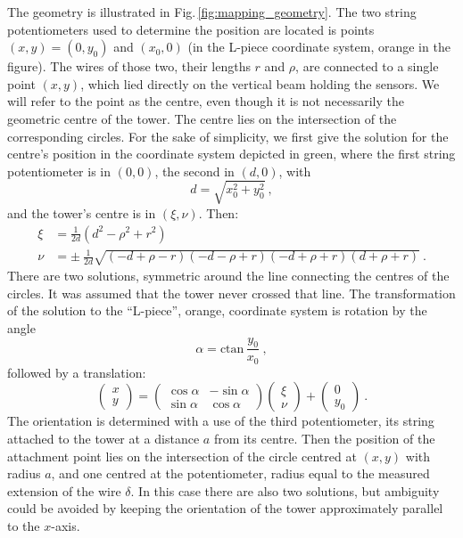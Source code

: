 The geometry is illustrated in Fig.\,\ref{fig:mapping_geometry}. The two string potentiometers used to determine the position are located is points $(x, y) = (0, y_0)$ and $(x_0, 0)$ (in the L-piece coordinate system, orange in the figure).
The wires of those two, their lengths $r$ and $\rho$, are connected to a single point $(x,y)$, which lied directly on the vertical beam holding the sensors. We will refer to the point as the centre, even though it is not necessarily the geometric centre of the tower. The centre lies on the intersection of the corresponding circles.
For the sake of simplicity, we first give the solution for the centre's position in the coordinate system depicted in green,
where the first string potentiometer is in $(0,0)$, the second in $(d, 0)$, with
\begin{equation}
  d = \sqrt{x_0^2 + y_0^2} \ ,
\end{equation}
and the tower's centre is in $(\xi, \nu)$. Then: 
\begin{align}
  \xi & = \frac{1}{2d} \left( d^2 - \rho^2 + r^2 \right) \\
  \nu & = \pm\ \frac{1}{2d} \sqrt{ (-d + \rho - r) (-d - \rho + r) (-d + \rho + r) (d + \rho + r) } \ .
\end{align}
There are two solutions, symmetric around the line connecting the centres of the circles. It was assumed that the tower never crossed that line.
The transformation of the solution to the ``L-piece'', orange, coordinate system is rotation by the angle 
\begin{equation}
  \alpha = \mathrm{ctan}\, \frac{y_0}{x_0} \ ,
\end{equation}
followed by a translation:
\begin{equation}
  \begin{pmatrix}
    x \\
    y
  \end{pmatrix}
  =
  \begin{pmatrix}
    \cos \alpha & -\sin \alpha \\
    \sin \alpha & \cos \alpha
  \end{pmatrix}
  \begin{pmatrix}
    \xi \\
    \nu
  \end{pmatrix}
  +
  \begin{pmatrix}
    0 \\
    y_0
  \end{pmatrix} \ .
\end{equation}
The orientation is determined with a use of the third potentiometer, its string attached to the tower at a distance $a$ from its centre. Then the position of the attachment point lies on the intersection of the circle centred at $(x,y)$ with radius $a$, and one centred at the potentiometer, radius equal to the measured extension of the wire $\delta$. In this case there are also two solutions, but ambiguity could be avoided by keeping the orientation of the tower approximately parallel to the $x$-axis.

